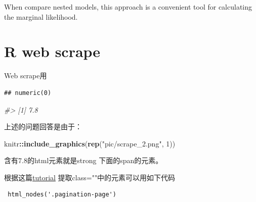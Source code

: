 \documentclass[
]{book}
\newenvironment{Shaded}{\begin{snugshade}}{\end{snugshade}}
\newcommand{\CommentTok}[1]{\textcolor[rgb]{0.56,0.35,0.01}{\textit{#1}}}
\newcommand{\DecValTok}[1]{\textcolor[rgb]{0.00,0.00,0.81}{#1}}
\newcommand{\KeywordTok}[1]{\textcolor[rgb]{0.13,0.29,0.53}{\textbf{#1}}}
\newcommand{\NormalTok}[1]{#1}
\newcommand{\OperatorTok}[1]{\textcolor[rgb]{0.81,0.36,0.00}{\textbf{#1}}}
\newcommand{\StringTok}[1]{\textcolor[rgb]{0.31,0.60,0.02}{#1}}
\theoremstyle{definition}
\theoremstyle{definition}
\theoremstyle{definition}
\theoremstyle{remark}
\begin{document}
When compare nested models, this approach is a convenient tool for calculating the marginal likelihood.

\hypertarget{r-web-scrape}{%
\chapter{R web scrape}\label{r-web-scrape}}

Web scrape用

\begin{Shaded}
\end{Shaded}

\begin{verbatim}
## numeric(0)
\end{verbatim}

\begin{Shaded}
\begin{Highlighting}[]
\CommentTok{#> [1] 7.8}
\end{Highlighting}
\end{Shaded}

上述的问题回答是由于：

\begin{Shaded}
\begin{Highlighting}[]
\NormalTok{knitr}\OperatorTok{::}\KeywordTok{include_graphics}\NormalTok{(}\KeywordTok{rep}\NormalTok{(}\StringTok{"pic/scrape_2.png"}\NormalTok{, }\DecValTok{1}\NormalTok{))}
\end{Highlighting}
\end{Shaded}

含有7.8的html元素就是strong 下面的span的元素。

根据这篇\href{https://www.datacamp.com/community/tutorials/r-web-scraping-rvest}{tutorial}
提取class=""中的元素可以用如下代码

\begin{verbatim}
 html_nodes('.pagination-page')
\end{verbatim}
\end{document}
